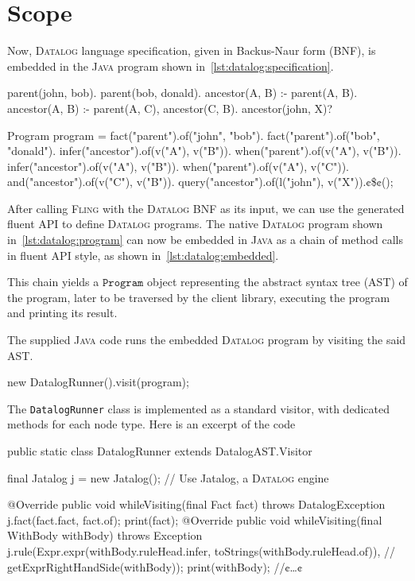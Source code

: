 \documentclass[a4paper,UKenglish,cleveref, autoref]{darts-v2019}
\newcommand{\Fling}{F\textsc{ling}\xspace}
\DeclareRobustCommand{\tt}[1]{{\ensuremath{\texttt{#1}}}}
\newcommand{\Java}{\textsc{Java}\xspace}
\newcommand{\Datalog}{\textsc{Datalog}\xspace}
\newenvironment{scope}{\section{Scope}}{}
\begin{document}
\begin{scope}
Now, \Datalog language specification, given in Backus-Naur form (BNF), is embedded in
the \Java program shown in~\cref{lst:datalog:specification}.
\begin{excerpt}[label={lst:datalog:program},caption=
  {\Datalog program}]
parent(john, bob).
parent(bob, donald).
ancestor(A, B) :- parent(A, B).
ancestor(A, B) :- parent(A, C), ancestor(C, B).
ancestor(john, X)?
\end{excerpt}
\begin{excerpt}[language=java,label={lst:datalog:embedded},caption=
  {Embedded \Datalog program}]
Program program =
  fact("parent").of("john", "bob").
  fact("parent").of("bob", "donald").
  infer("ancestor").of(v("A"), v("B")).
    when("parent").of(v("A"), v("B")).
  infer("ancestor").of(v("A"), v("B")).
    when("parent").of(v("A"), v("C")).
    and("ancestor").of(v("C"), v("B")).
  query("ancestor").of(l("john"), v("X")).¢\$¢();
\end{excerpt}
After calling \Fling with the \Datalog BNF as its input, we can use the generated
fluent API to define \Datalog programs. The native \Datalog program shown in~\cref{lst:datalog:program}
can now be embedded in \Java as a chain of method calls in fluent API style, as
shown in~\cref{lst:datalog:embedded}.

This chain yields a \tt{Program} object representing the abstract syntax tree (AST)
of the program, later to be traversed by the client library, executing the program and printing
its result.

The supplied \Java code runs the embedded \Datalog program by visiting the
said AST.
\begin{excerpt}[language=java]
    new DatalogRunner().visit(program);
\end{excerpt}
The \texttt{DatalogRunner} class is implemented as a standard visitor,
with dedicated methods for each node type. Here is an excerpt of the code
\begin{excerpt}[language=java]
public static class DatalogRunner extends DatalogAST.Visitor {
  final Jatalog j = new Jatalog(); // Use Jatalog, a \Datalog engine

  @Override public void whileVisiting(final Fact fact) throws DatalogException {
    j.fact(fact.fact, fact.of);
    print(fact);
  }
  @Override public void whileVisiting(final WithBody withBody) throws Exception {
    j.rule(Expr.expr(withBody.ruleHead.infer, toStrings(withBody.ruleHead.of)), //
        getExprRightHandSide(withBody));
    print(withBody);
  }
  //¢\ldots¢
}
\end{excerpt}


\end{scope}
\end{document}

